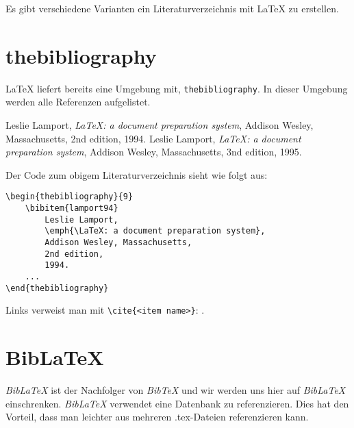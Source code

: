 \documentclass[a4paper]{article}
\begin{document}
Es gibt verschiedene Varianten ein Literaturverzeichnis mit \LaTeX{} zu
erstellen.



\tableofcontents

\section{thebibliography}
\LaTeX{} liefert bereits eine Umgebung mit, \verb+thebibliography+. In dieser
Umgebung werden alle Referenzen aufgelistet.
\begin{thebibliography}{9}
		Leslie Lamport,
		\emph{\LaTeX: a document preparation system},
		Addison Wesley, Massachusetts,
		2nd edition,
		1994.
		Leslie Lamport,
		\emph{\LaTeX: a document preparation system},
		Addison Wesley, Massachusetts,
		3nd edition,
		1995.
\end{thebibliography}

Der Code zum obigem Literaturverzeichnis sieht wie folgt aus:
\begin{lstlisting}[]
\begin{thebibliography}{9}
	\bibitem{lamport94}
		Leslie Lamport,
		\emph{\LaTeX: a document preparation system},
		Addison Wesley, Massachusetts,
		2nd edition,
		1994.
	...
\end{thebibliography}
\end{lstlisting}

Links verweist man mit \verb+\cite{<item name>}+: \cite{lamport94}.

\section{BibLaTeX}
\emph{BibLaTeX} ist der Nachfolger von \emph{BibTeX} und wir werden uns hier auf
\emph{BibLaTeX} einschrenken. \emph{BibLaTeX} verwendet eine Datenbank zu
referenzieren. Dies hat den Vorteil, dass man leichter aus mehreren .tex-Dateien
referenzieren kann.

\end{document}
